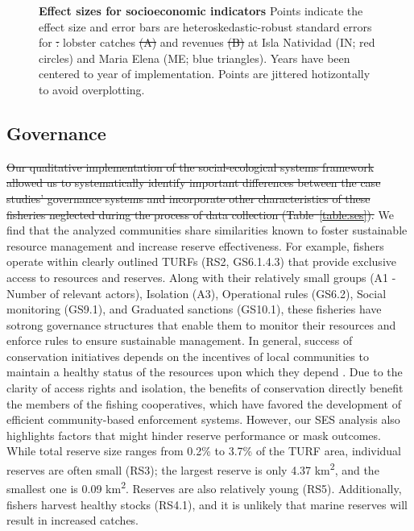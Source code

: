\documentclass[10pt,letterpaper]{article}
\providecommand{\DIFdeltex}[1]{{\protect\color{red}\sout{#1}}}                      %
\providecommand{\DIFdelbegin}{} %
\providecommand{\DIFdelend}{} %
\providecommand{\DIFdelFL}[1]{\DIFdel{#1}} %
\providecommand{\DIFdelbeginFL}{} %
\providecommand{\DIFdelendFL}{} %
\providecommand{\DIFdel}[1]{\texorpdfstring{\DIFdeltex{#1}}{}} %
\newcommand{\DIFscaledelfig}{0.5}
\newlength{\DIFdelgraphicswidth} %
\newlength{\DIFdelgraphicsheight} %
\newcommand{\DIFdelincludegraphics}[2][]{%
\sbox{\DIFdelgraphicsbox}{\DIFOincludegraphics[#1]{#2}}%
\settoboxwidth{\DIFdelgraphicswidth}{\DIFdelgraphicsbox} %
\settoboxtotalheight{\DIFdelgraphicsheight}{\DIFdelgraphicsbox} %
\scalebox{\DIFscaledelfig}{%
\parbox[b]{\DIFdelgraphicswidth}{\usebox{\DIFdelgraphicsbox}\\[-\baselineskip] \rule{\DIFdelgraphicswidth}{0em}}\llap{\resizebox{\DIFdelgraphicswidth}{\DIFdelgraphicsheight}{%
\setlength{\unitlength}{\DIFdelgraphicswidth}%
\begin{picture}(1,1)%
\thicklines\linethickness{2pt} %
{\color[rgb]{1,0,0}\put(0,0){\framebox(1,1){}}}%
{\color[rgb]{1,0,0}\put(0,0){\line( 1,1){1}}}%
{\color[rgb]{1,0,0}\put(0,1){\line(1,-1){1}}}%
\end{picture}%
}\hspace*{3pt}}} %
} %
\DeclareRobustCommand{\DIFdelbegin}{\DIFOdelbegin \let\includegraphics\DIFdelincludegraphics} %
\DeclareRobustCommand{\DIFdelend}{\DIFOaddend \let\includegraphics\DIFOincludegraphics} %
\DeclareRobustCommand{\DIFdelbeginFL}{\DIFOdelbeginFL \let\includegraphics\DIFdelincludegraphics} %
\DeclareRobustCommand{\DIFdelendFL}{\DIFOaddendFL \let\includegraphics\DIFOincludegraphics} %
\begin{document}
\begin{figure}[!h]
\centering
\caption{{\bf Effect sizes for socioeconomic indicators}
Points indicate the effect size and error bars are heteroskedastic-robust standard errors for \DIFdelbeginFL \DIFdelFL{: }\DIFdelendFL lobster catches \DIFdelbeginFL \DIFdelFL{(A) }\DIFdelendFL and revenues \DIFdelbeginFL \DIFdelFL{(B) }\DIFdelendFL at Isla Natividad (IN; red circles) and Maria Elena (ME; blue triangles). Years have been centered to year of implementation. Points are jittered hotizontally to avoid overplotting.}
\label{fig:lobsters}
\end{figure}

\subsection*{Governance}

\DIFdelbegin \DIFdel{Our qualitative implementation of the social-ecological systems framework allowed us to systematically identify important differences between the case studies’ governance systems and incorporate other characteristics of these fisheries neglected during the process of data collection (Table~\ref{table:ses}). }\DIFdelend We find that the analyzed communities share similarities known to foster sustainable resource management and increase reserve effectiveness. For example, fishers operate within clearly outlined TURFs (RS2, GS6.1.4.3) that provide exclusive access to resources and reserves. Along with their relatively small groups (A1 - Number of relevant actors), Isolation (A3), Operational rules (GS6.2), Social monitoring (GS9.1), and Graduated sanctions (GS10.1), these fisheries have sotrong governance structures that enable them to monitor their resources and enforce rules to ensure sustainable management. In general, success of conservation initiatives depends on the incentives of local communities to maintain a healthy status of the resources upon which they depend \cite{jupiter_2017}. Due to the clarity of access rights and isolation, the benefits of conservation directly benefit the members of the fishing cooperatives, which have favored the development of efficient community-based enforcement systems. However, our SES analysis also highlights factors that might hinder reserve performance or mask outcomes. While total reserve size ranges from 0.2\% to 3.7\% of the TURF area, individual reserves are often small (RS3); the largest reserve is only 4.37 km\textsuperscript{2}, and the smallest one is 0.09 km\textsuperscript{2}. Reserves are also relatively young (RS5). Additionally, fishers harvest healthy stocks (RS4.1), and it is unlikely that marine reserves will result in increased catches.
\end{document}
